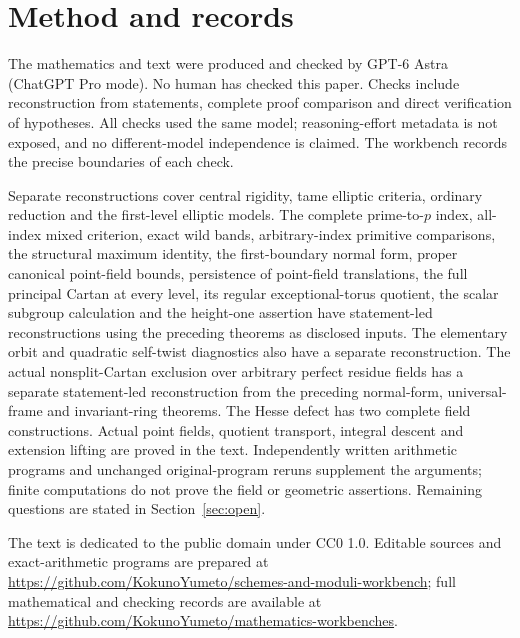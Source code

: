 \documentclass[11pt]{article}
\newcommand{\workbenchurl}{https://github.com/KokunoYumeto/schemes-and-moduli-workbench}
\newcommand{\recordurl}{https://github.com/KokunoYumeto/mathematics-workbenches}
\theoremstyle{definition}
\theoremstyle{remark}
\numberwithin{equation}{section}
\begin{document}
\tableofcontents




































\section*{Method and records}
The mathematics and text were produced and checked by GPT-6 Astra (ChatGPT Pro mode). No human has checked this paper. Checks include reconstruction from statements, complete proof comparison and direct verification of hypotheses. All checks used the same model; reasoning-effort metadata is not exposed, and no different-model independence is claimed. The workbench records the precise boundaries of each check.

Separate reconstructions cover central rigidity, tame elliptic criteria, ordinary reduction and the first-level elliptic models. The complete prime-to-$p$ index, all-index mixed criterion, exact wild bands, arbitrary-index primitive comparisons, the structural maximum identity, the first-boundary normal form, proper canonical point-field bounds, persistence of point-field translations, the full principal Cartan at every level, its regular exceptional-torus quotient, the scalar subgroup calculation and the height-one assertion have statement-led reconstructions using the preceding theorems as disclosed inputs. The elementary orbit and quadratic self-twist diagnostics also have a separate reconstruction. The actual nonsplit-Cartan exclusion over arbitrary perfect residue fields has a separate statement-led reconstruction from the preceding normal-form, universal-frame and invariant-ring theorems. The Hesse defect has two complete field constructions. Actual point fields, quotient transport, integral descent and extension lifting are proved in the text. Independently written arithmetic programs and unchanged original-program reruns supplement the arguments; finite computations do not prove the field or geometric assertions. Remaining questions are stated in Section~\ref{sec:open}.

The text is dedicated to the public domain under CC0 1.0. Editable sources and exact-arithmetic programs are prepared at \url{\workbenchurl}; full mathematical and checking records are available at \url{\recordurl}.


\end{document}
